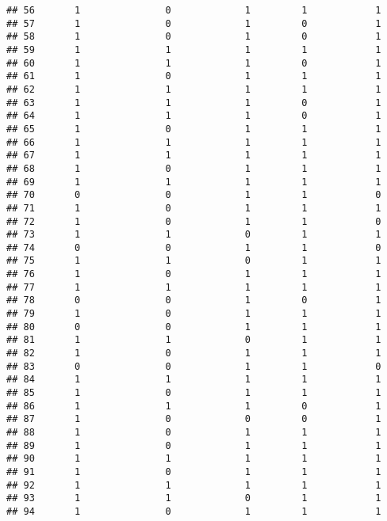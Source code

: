 \documentclass[]{article}
\begin{document}
\begin{verbatim}
## 56       1               0             1         1            1
## 57       1               0             1         0            1
## 58       1               0             1         0            1
## 59       1               1             1         1            1
## 60       1               1             1         0            1
## 61       1               0             1         1            1
## 62       1               1             1         1            1
## 63       1               1             1         0            1
## 64       1               1             1         0            1
## 65       1               0             1         1            1
## 66       1               1             1         1            1
## 67       1               1             1         1            1
## 68       1               0             1         1            1
## 69       1               1             1         1            1
## 70       0               0             1         1            0
## 71       1               0             1         1            1
## 72       1               0             1         1            0
## 73       1               1             0         1            1
## 74       0               0             1         1            0
## 75       1               1             0         1            1
## 76       1               0             1         1            1
## 77       1               1             1         1            1
## 78       0               0             1         0            1
## 79       1               0             1         1            1
## 80       0               0             1         1            1
## 81       1               1             0         1            1
## 82       1               0             1         1            1
## 83       0               0             1         1            0
## 84       1               1             1         1            1
## 85       1               0             1         1            1
## 86       1               1             1         0            1
## 87       1               0             0         0            1
## 88       1               0             1         1            1
## 89       1               0             1         1            1
## 90       1               1             1         1            1
## 91       1               0             1         1            1
## 92       1               1             1         1            1
## 93       1               1             0         1            1
## 94       1               0             1         1            1

\end{verbatim}
\end{document}
